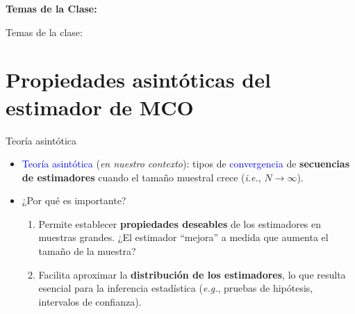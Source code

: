 \documentclass[10pt, xcolor=dvipsnames]{beamer}
\subtitle{Propiedades del Estimador de Mínimos Cuadrados Ordinarios (MCO)}
\begin{document}
	\beamertemplatenavigationsymbolsempty	
\begin{frame}[plain]%
	\titlepage
	\vspace{-0.4cm}
\textbf{Temas de la Clase:} \\ \vspace{0.3cm}
	\tableofcontents
\end{frame}

\begin{frame}{Temas de la clase:}
	\tableofcontents
\end{frame}

\section{Propiedades asintóticas del estimador de MCO}

\begin{frame}{Teoría asintótica}
\begin{itemize}
    \item \textcolor{blue}{Teoría asintótica} (\textit{en nuestro contexto}): tipos de \textcolor{blue}{convergencia} de \textbf{secuencias de estimadores} cuando el tamaño muestral crece (\textit{i.e.}, $N \to \infty$). \\ \vspace{0.3cm}
    \item ¿Por qué es importante? \\ \vspace{0.1cm}
\begin{enumerate}
    \item Permite establecer \textbf{propiedades deseables} de los estimadores en muestras grandes. ¿El estimador ``mejora'' a medida que aumenta el tamaño de la muestra? \\ \vspace{0.2cm}
    \item Facilita aproximar la \textbf{distribución de los estimadores}, lo que resulta esencial para la inferencia estadística (\textit{e.g.}, pruebas de hipótesis, intervalos de confianza).
\end{enumerate}
\end{itemize}	
\end{frame}

\end{document}
